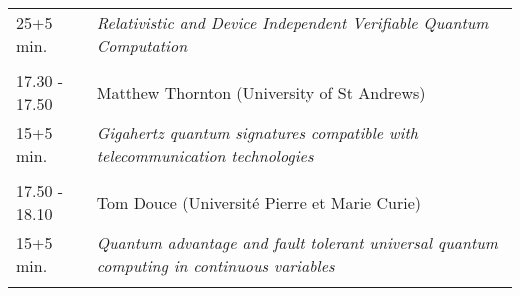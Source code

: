 \begin{longtable}{p{3cm}p{13cm}}
25+5 min. & {\it Relativistic and Device Independent Verifiable Quantum Computation}\\ 
 & \\ 
17.30 - 17.50 & Matthew Thornton (University of St Andrews)\\ 
15+5 min. & {\it Gigahertz quantum signatures compatible with telecommunication technologies}\\ 
 & \\ 
17.50 - 18.10 & Tom Douce (Université Pierre et Marie Curie)\\ 
15+5 min. & {\it Quantum advantage and fault tolerant universal quantum computing in continuous variables}\\ 
 & \\ 
\end{longtable}

